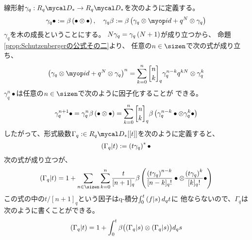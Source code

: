 {	線形射$\gamma_q:R_q\D_*\to R_q\D_*$を次のように定義する。
	\begin{equation*}\begin{split}
		\gamma_q\bullet := \beta\lr{\bullet\otimes\bullet},\quad
		\gamma_q\beta := \beta\lr{\gamma_q\otimes\id + q^N\otimes\gamma_q}
	\end{split}\end{equation*}
	$\gamma_q$を木の成長ということにする。
	$N\gamma_q=\gamma_q\left({N+1}\right)$が成り立つから、
	命題\ref{prop:Schutzenbergerの公式その二}より、
	任意の$n\in\sizen$で次の式が成り立ち、
	\begin{equation}\label{eq:木の成長の因子化その一}\begin{split}
		\lr{\gamma_q\otimes\id + q^N\otimes\gamma_q}^n
		= \sum_{k=0}^n\qbinom{n}{k}_q \gamma_q^{n-k}q^{kN}\otimes\gamma_q^k
	\end{split}\end{equation}
	$\gamma_q^n\bullet$は任意の$n\in\sizen$で次のように因子化することが
	できる。
	\begin{equation}\label{eq:木の成長の因子化その二}\begin{split}
		\gamma_q^{n+1}\bullet = \gamma_q^n\beta\lr{\bullet\otimes\bullet}
		= \sum_{k=0}^n\qbinom{n}{k}_q\beta\lr{\gamma_q^{n-k}\bullet
			\otimes\gamma_q^k\bullet}
	\end{split}\end{equation}
	したがって、形式級数$\Gamma_q:\in R_q\D_*[[t]]$を次のように定義すると、
	\begin{equation*}\begin{split}
		\left({\Gamma_q|t}\right) := \left({t\gamma_q}\right)^*\bullet
	\end{split}\end{equation*}
	次の式が成り立つが、
	\begin{equation*}\begin{split}
		\lr{\Gamma_q|t} = 1 + \sum_{n\in\sizen}\sum_{k=0}^n \frac{t}{[n+1]_q}
			\beta\lr{\frac{\lr{t\gamma_q}^{n-k}}{[n-k]_q!}\bullet
			\otimes\frac{\lr{t\gamma_q}^k}{[k]_q!}\bullet}
	\end{split}\end{equation*}
	この式の中の$t/[n+1]_q$という因子はq-積分$\int_0^t\left({f|s}\right)d_qt$に
	他ならないので、$\Gamma_q$は次のように書くことができる。
	\begin{equation}\label{eq:q-Dyck微分方程式その一}\begin{split}
		\left({\Gamma_q|t}\right) = 1 + \int_0^t \beta\bigl({\left({\Gamma_q|s}\right)
			\otimes\left({\Gamma_q|s}\right)}\bigr) d_qs
	\end{split}\end{equation}
}
